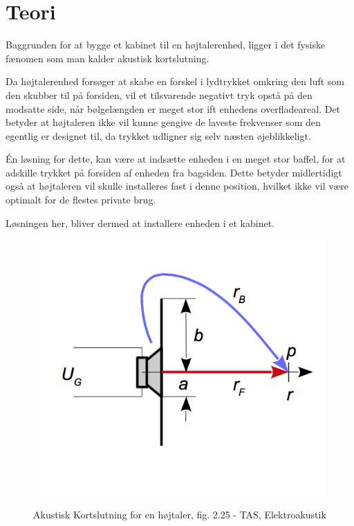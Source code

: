 \chapter{Teori}
\label{chapt:Teori}

Baggrunden for at bygge et kabinet til en højtalerenhed, ligger i det fysiske fænomen som man kalder akustisk kortslutning. 

Da højtalerenhed forsøger at skabe en forskel i lydtrykket omkring den luft som den skubber til på forsiden, vil et tilsvarende negativt tryk opstå på den modsatte side, når bølgelængden er meget stor ift enhedens overfladeareal. Det betyder at højtaleren ikke vil kunne gengive de laveste frekvenser som den egentlig er designet til, da trykket udligner sig selv næsten øjeblikkeligt. 

Én løsning for dette, kan være at indsætte enheden i en meget stor baffel, for at adskille trykket på forsiden af enheden fra bagsiden. Dette betyder midlertidigt også at højtaleren vil skulle installeres fast i denne position, hvilket ikke vil være optimalt for de flestes private brug. 

Løsningen her, bliver dermed at installere enheden i et kabinet. 



\begin{figure}[h!]
	\centering
	\includegraphics[trim={0 1.5cm 0 1cm}, clip=true,width=.6\textwidth]{Pics/kortslutning}
	\label{fig:kortslutning}
	\caption{Akustisk Kortslutning for en højtaler, fig. 2.25 - TAS, Elektroakustik}
\end{figure}



